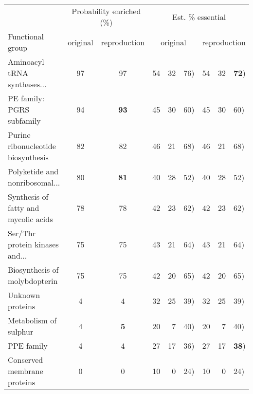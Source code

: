 \begin{tabular}{lccc@{ (}r@{--}lc@{ (}r@{--}l}
  \hline
  & \multicolumn{2}{c}{Probability enriched (\%)} & \multicolumn{6}{c}{Est. \% essential}\\ Functional group & original & reproduction & \multicolumn{3}{c}{original} & \multicolumn{3}{c}{reproduction}\\ \hline
Aminoacyl tRNA synthases... & 97 & 97 & 54 & 32 & 76) & 54 & 32 & \textbf{\color{red} 72}) \\ 
  PE family: PGRS subfamily & 94 & \textbf{\color{red} 93} & 45 & 30 & 60) & 45 & 30 & 60) \\ 
  Purine ribonucleotide biosynthesis & 82 & 82 & 46 & 21 & 68) & 46 & 21 & 68) \\ 
  Polyketide and nonribosomal... & 80 & \textbf{\color{red} 81} & 40 & 28 & 52) & 40 & 28 & 52) \\ 
  Synthesis of fatty and mycolic acids & 78 & 78 & 42 & 23 & 62) & 42 & 23 & 62) \\ 
  Ser/Thr protein kinases and... & 75 & 75 & 43 & 21 & 64) & 43 & 21 & 64) \\ 
  Biosynthesis of molybdopterin & 75 & 75 & 42 & 20 & 65) & 42 & 20 & 65) \\ 
  Unknown proteins & 4 & 4 & 32 & 25 & 39) & 32 & 25 & 39) \\ 
  Metabolism of sulphur & 4 & \textbf{\color{red} 5} & 20 & 7 & 40) & 20 & 7 & 40) \\ 
  PPE family & 4 & 4 & 27 & 17 & 36) & 27 & 17 & \textbf{\color{red} 38}) \\ 
  Conserved membrane proteins & 0 & 0 & 10 & 0 & 24) & 10 & 0 & 24) \\ 
   \hline
\end{tabular}
